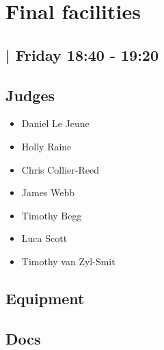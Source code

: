 \documentclass[10pt]{article}
\begin{document}
		\begin{minipage}{\linewidth}
		\setcounter{section}{5}
	\section{Final facilities }
	\subsection*{ | Friday 18:40 - 19:20}

	

	\begin{multicols}{2}
	\subsection*{\faUsers \: Judges}
	\begin{itemize}
			\item Daniel Le Jeune
			\item Holly Raine
			\item Chris Collier-Reed
			\item James Webb
			\item Timothy Begg
			\item Luca Scott
			\item Timothy van Zyl-Smit
		\end{itemize}
	\columnbreak
	\subsection*{\faWrench \: Equipment}
	        \vfill\null
        \subsection*{\faFile \: Docs}
     	\end{multicols}


	\vspace{1cm}
	\end{minipage}
\end{document}
